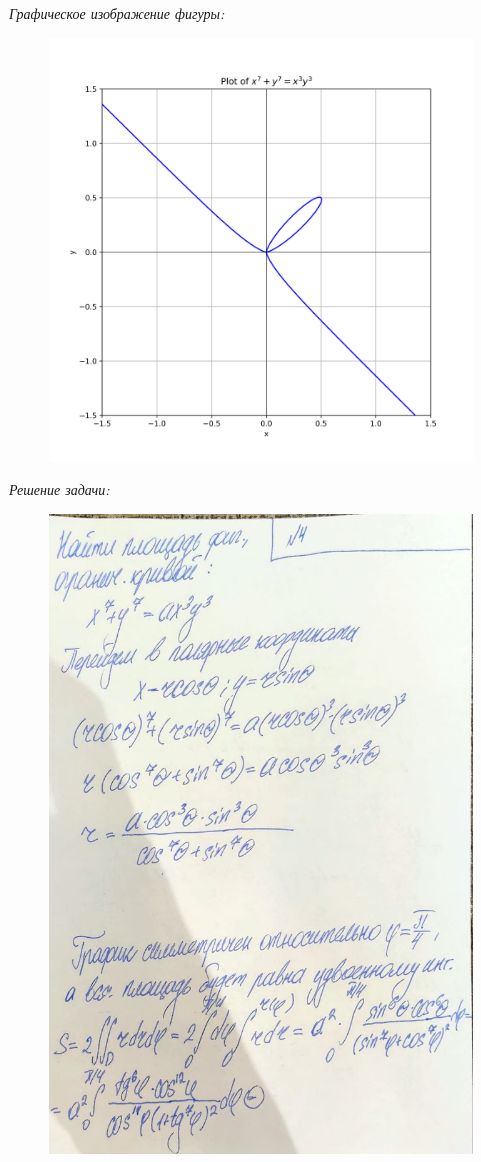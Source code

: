 \documentclass[a4paper,12pt]{article}
\begin{document}
\emph{Графическое изображение фигуры:}
\begin{figure}[H]
    \centering
    \includegraphics[width=0.9\linewidth]{../img/graph_task4.png}
    \label{fig:integral}
\end{figure}


\emph{Решение задачи:}

\begin{figure}[H]
    \centering
    \includegraphics[width=0.8\linewidth]{../img/4_1.jpg}
    \caption{}
    \label{fig:part1}
\end{figure}
\end{document}
